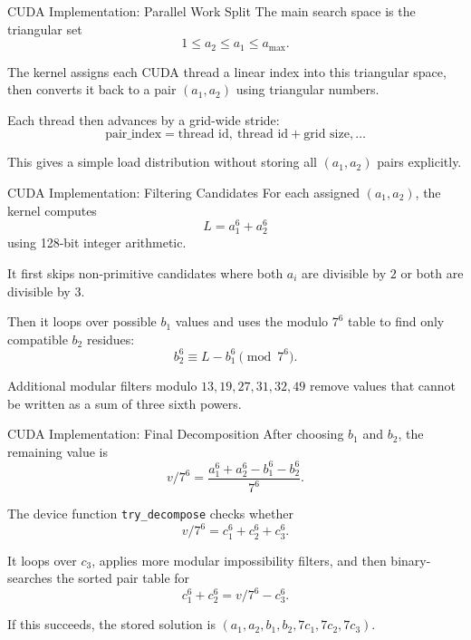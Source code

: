 \documentclass[]{beamer}
\begin{document}
\begin{frame}{CUDA Implementation: Parallel Work Split}
  The main search space is the triangular set
  \begin{equation*}
    1 \leq a_2 \leq a_1 \leq a_{\max}.
  \end{equation*}
  \pause

  The kernel assigns each CUDA thread a linear index into this triangular
  space, then converts it back to a pair $(a_1,a_2)$ using triangular numbers.
  \pause
  \bigskip

  Each thread then advances by a grid-wide stride:
  \begin{equation*}
    \text{pair\_index} =
    \text{thread id},\ \text{thread id} + \text{grid size},\ldots
  \end{equation*}
  \pause

  This gives a simple load distribution without storing all $(a_1,a_2)$ pairs
  explicitly.
\end{frame}

\begin{frame}{CUDA Implementation: Filtering Candidates}
  For each assigned $(a_1,a_2)$, the kernel computes
  \begin{equation*}
    L = a_1^6 + a_2^6
  \end{equation*}
  using 128-bit integer arithmetic.
  \pause

  It first skips non-primitive candidates where both $a_i$ are divisible by
  $2$ or both are divisible by $3$.
  \pause
  \bigskip

  Then it loops over possible $b_1$ values and uses the modulo $7^6$ table to
  find only compatible $b_2$ residues:
  \begin{equation*}
    b_2^6 \equiv L - b_1^6 \pmod{7^6}.
  \end{equation*}
  \pause

  Additional modular filters modulo $13,19,27,31,32,49$ remove values that
  cannot be written as a sum of three sixth powers.
\end{frame}

\begin{frame}{CUDA Implementation: Final Decomposition}
  After choosing $b_1$ and $b_2$, the remaining value is
  \begin{equation*}
    v/7^6 =
    \frac{a_1^6 + a_2^6 - b_1^6 - b_2^6}{7^6}.
  \end{equation*}
  \pause

  The device function \texttt{try\_decompose} checks whether
  \begin{equation*}
    v/7^6 = c_1^6 + c_2^6 + c_3^6.
  \end{equation*}
  \pause

  It loops over $c_3$, applies more modular impossibility filters, and then
  binary-searches the sorted pair table for
  \begin{equation*}
    c_1^6 + c_2^6 = v/7^6 - c_3^6.
  \end{equation*}
  \pause

  If this succeeds, the stored solution is
  $(a_1,a_2,b_1,b_2,7c_1,7c_2,7c_3)$.
\end{frame}
\end{document}
